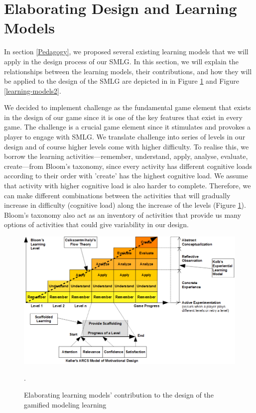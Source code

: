 \documentclass[12pt, a4paper]{report}
\begin{document}
\section{Elaborating Design and Learning Models}
\label{Elaborating Design and Learning Models}
In section \ref{Pedagogy}, we proposed several existing learning models that we will apply in the design process of our SMLG. In this section, we will explain the relationships between the learning models, their contributions, and how they will be applied to the design of the SMLG are depicted in in Figure \ref{learning-models} and Figure \ref{learning-models2}.

We decided to implement challenge as the fundamental game element that exists in the design of our game since it is one of the key features that exist in every game. The challenge is a crucial game element since it stimulates and provokes a player to engage with SMLG. We translate challenge into series of levels in our design and of course higher levels come with higher difficulty. To realise this, we borrow the learning activities---remember, understand, apply, analyse, evaluate, create---from Bloom's taxonomy, since every activity has different cognitive loads according to their order with 'create' has the highest cognitive load. We assume that activity with higher cognitive load is also harder to complete. Therefore, we can make different combinations between the activities that will gradually increase in difficulty (cognitive load) along the increase of the levels (Figure \ref{learning-models}). Bloom's taxonomy also act as an inventory of activities that provide us many options of activities that could give variability in our design. 

\begin{figure}[ht]
\centering
\includegraphics[width=\textwidth]{learning-models}
\caption{Elaborating learning models' contribution to the design of the gamified modeling learning}.
\label{learning-models}
\end{figure}
\end{document}
